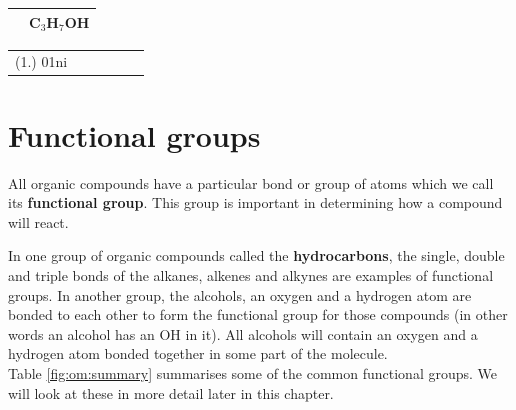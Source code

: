 {\begin{center}
\begin{tabular}{|c|c|}
& 

C$_{3}$H$_{7}$OH \\\hline

\end{tabular}
\end{center}

\par \practiceinfo
\par \begin{tabular}[h]{cccccc}
(1.)	01ni	&
\end{tabular}
}







\section{Functional groups}
\label{sec:organic:functional}

All organic compounds have a particular bond or group of atoms which we call its \textbf{functional group}. This group is important in determining how a compound will react. 


In one group of organic compounds called the \textbf{hydrocarbons}, the single, double and triple bonds of the alkanes, alkenes and alkynes are examples of functional groups. In another group, the alcohols, an oxygen and a hydrogen atom   are bonded to each other to form the functional group for those compounds (in other words an alcohol has an OH in it). All alcohols will contain an oxygen and a hydrogen atom bonded together in some part of the molecule. \\

Table \ref{fig:om:summary} summarises some of the common functional groups. We will look at these in more detail later in this chapter.

